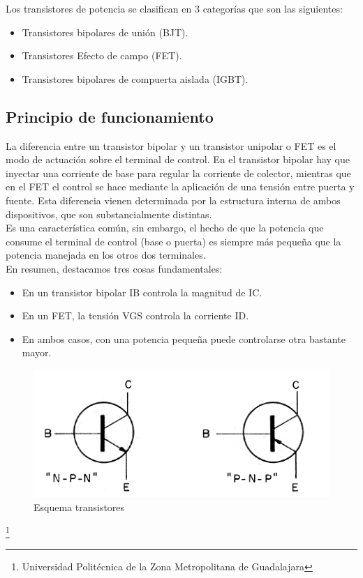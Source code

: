 \documentclass[10pt,a4paper]{article}
\begin{document}
Los transistores de potencia se clasifican en 3 categorías que son las siguientes:
\begin{itemize}
\item Transistores bipolares de unión (BJT).
\item Transistores  Efecto de campo (FET).
\item Transistores bipolares de compuerta aislada  (IGBT).
\end{itemize}

\subsection{Principio de funcionamiento}
La diferencia entre un transistor bipolar y un transistor unipolar o FET es el modo de actuación sobre el terminal de control. En el transistor bipolar hay que inyectar una corriente de base para regular la corriente de colector, mientras que en el FET el control se hace mediante la aplicación de una tensión entre puerta y fuente. Esta diferencia vienen determinada por la estructura interna de ambos dispositivos, que son substancialmente distintas.\\

Es una característica común, sin embargo, el hecho de que la potencia que consume el terminal de control (base o puerta) es siempre más pequeña que la potencia manejada en los otros dos terminales.\\

En resumen, destacamos tres cosas fundamentales:\\
\begin{itemize}
\item En un transistor bipolar IB controla la magnitud de IC.
\item En un FET, la tensión VGS controla la corriente ID.
\item En ambos casos, con una potencia pequeña puede controlarse otra bastante mayor.
\end{itemize}

\begin{figure}[hbtp]
\centering
\includegraphics[scale=0.75]{imagenes/transistor.jpg}
\caption{Esquema transistores}
\end{figure}
\footnote{Universidad Politécnica de la Zona Metropolitana de Guadalajara}
\end{document}
